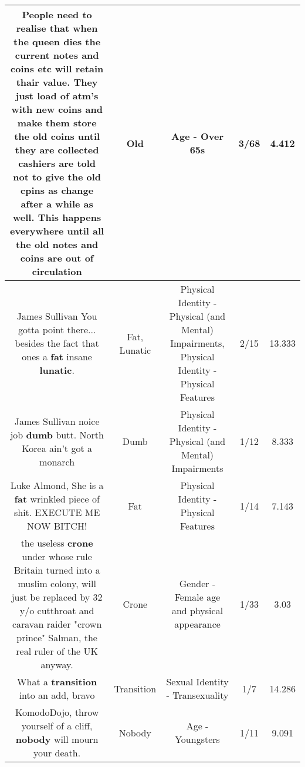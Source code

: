 \documentclass[11pt]{article}
\newlength\mylength
\begin{document}
\begin{center}
\begin{longtable}{|C{.65\mylength}|C{.30\mylength}|C{.12\mylength}|C{.12\mylength}|C{.12\mylength}|}
  \small People need to realise that when the queen dies the current notes and coins etc will retain thair value. They just load of atm's with new coins and make them store the \textbf{old} coins until they are collected cashiers are told not to give the \textbf{old} cpins as change after a while as well. This happens everywhere until all the \textbf{old} notes and coins are out of circulation\normalsize   & Old & Age - Over 65s & 3/68 & 4.412 \\  \hline
  \small James Sullivan You gotta point there... besides the fact that ones a \textbf{fat} insane \textbf{lunatic}.\normalsize   & Fat, Lunatic & Physical Identity - Physical (and Mental) Impairments, Physical Identity - Physical Features & 2/15 & 13.333 \\  \hline
  \small James Sullivan noice job \textbf{dumb} butt. North Korea ain't got a monarch\normalsize   & Dumb & Physical Identity - Physical (and Mental) Impairments & 1/12 & 8.333 \\  \hline
  \small Luke Almond, She is a \textbf{fat} wrinkled piece of shit. EXECUTE ME NOW BITCH!\normalsize   & Fat & Physical Identity - Physical Features & 1/14 & 7.143 \\  \hline
  \small the useless \textbf{crone} under whose rule Britain turned into a muslim colony, will just be replaced by 32 y/o cutthroat and caravan raider "crown prince" Salman, the real ruler of the UK anyway.\normalsize   & Crone & Gender - Female age and physical appearance & 1/33 & 3.03 \\  \hline
  \small What a \textbf{transition} into an add, bravo\normalsize   & Transition & Sexual Identity - Transexuality & 1/7 & 14.286 \\  \hline
  \small KomodoDojo, throw yourself of a cliff, \textbf{nobody} will mourn your death.\normalsize   & Nobody & Age - Youngsters & 1/11 & 9.091 \\  \hline

\end{longtable}
\end{center}
\end{document}
